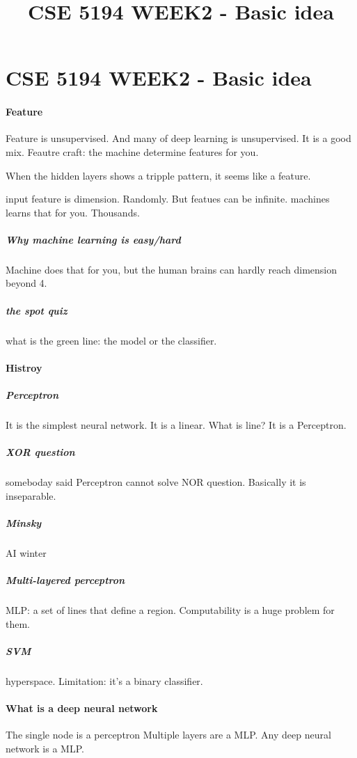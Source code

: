 \documentclass[12pt]{article}
\begin{document}
\section*{CSE 5194 WEEK2 - Basic idea}
    \title{CSE 5194 WEEK2 - Basic idea}
    \paragraph{Feature}
    Feature is unsupervised. And many of deep learning is unsupervised. It is a good mix. 
    Feautre craft: the machine determine features for you.

    When the hidden layers shows a tripple pattern, it seems like a feature.

    input feature is dimension. Randomly.
    But featues can be infinite. machines learns that for you. Thousands.

    \subparagraph{Why machine learning is easy/hard}
    Machine does that for you, but the human brains can hardly reach dimension beyond 4.

    \subparagraph{the spot quiz}
    what is the green line: the model or the classifier.

    \paragraph{Histroy}
    \subparagraph{Perceptron}
    It is the simplest neural network. It is a linear. What is line? It is a Perceptron.
    \subparagraph{XOR question}
    someboday said Perceptron cannot solve NOR question. Basically it is inseparable.
    \subparagraph{Minsky}
    AI winter
    \subparagraph{Multi-layered perceptron}  
    MLP: a set of lines that define a region.
    Computability is a huge problem for them.

    \subparagraph{SVM}
    hyperspace. Limitation: it's a binary classifier.

    \paragraph{What is a deep neural network}
    The single node is a perceptron
    Multiple layers are a MLP.
    Any deep neural network is a MLP.

    
\end{document}
